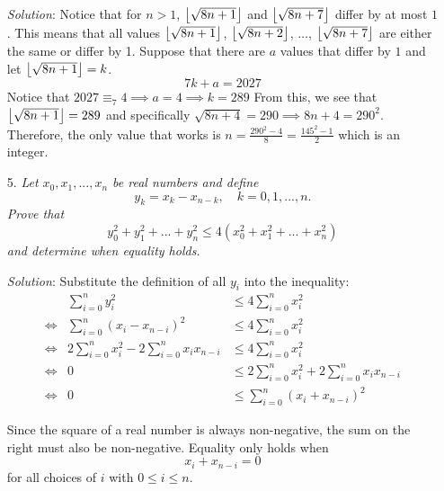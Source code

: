 \documentclass{article}
\begin{document}
\begin{enumerate}[1.]
\textit{Solution}:
Notice that for $n > 1$, $\left\lfloor\sqrt{8n + 1}\right\rfloor$ and $\left\lfloor\sqrt{8n + 7}\right\rfloor$ differ by at most $1$. This means that all values $\left\lfloor\sqrt{8n + 1}\right\rfloor$, $\left\lfloor\sqrt{8n + 2}\right\rfloor$, $\dots$, $\left\lfloor\sqrt{8n + 7}\right\rfloor$ are either the same or differ by 1. Suppose that there are $a$ values that differ by $1$ and let $\left\lfloor\sqrt{8n + 1}\right\rfloor = k$.
$$7k + a = 2027$$
Notice that $2027 \equiv _7 4 \implies a = 4 \implies k = 289$ From this, we see that $\left\lfloor\sqrt{8n + 1}\right\rfloor = 289$ and specifically $\sqrt{8n + 4} = 290 \implies 8n + 4 = 290^2$. Therefore, the only value that works is $n = \frac{290^2 - 4}{8} = \frac{145^2 - 1}{2}$ which is an integer.

\item[5.] %
\textit{
Let $x_0, x_1,..., x_n$ be real numbers and define
\[y_k=x_k-x_{n-k}, \quad k=0,1,...,n.\]
Prove that 
\[y_0^2 + y_1^2+...+ y_n^2 \leq 4(x_0^2 + x_1^2 + ... + x_n^2) \]
and determine when equality holds.
}

\textit{Solution}: 
Substitute the definition of all $y_i$ into the inequality:
\begin{align*}
  &&\sum_{i = 0}^{n}y_i^2 &\leq 4\sum_{i = 0}^{n}x_i^2 &\\
  &\iff& \sum_{i = 0}^{n}(x_i - x_{n - i})^2 &\leq 4\sum_{i = 0}^{n}x_i^2 &\\
  &\iff& 2\sum_{i = 0}^{n}x_i^2 - 2\sum_{i = 0}^{n}x_ix_{n - i} &\leq 4\sum_{i = 0}^{n}x_i^2& \\
  &\iff& 0 &\leq 2\sum_{i = 0}^{n}x_i^2 + 2\sum_{i = 0}^{n}x_ix_{n - i} \\
  &\iff& 0 &\leq \sum_{i = 0}^{n}(x_i + x_{n - i})^2 &
\end{align*}

Since the square of a real number is always non-negative, the sum on the right must also be non-negative. Equality only holds when
$$x_i + x_{n - i} = 0$$
for all choices of $i$ with $0 \le i \le n$.

\end{enumerate}
\end{document}
